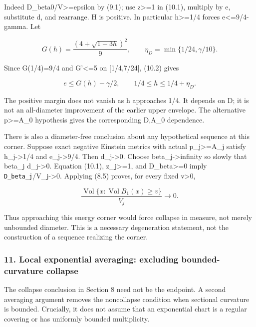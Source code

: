 \documentclass[
  10pt,
]{article}
\begin{document}
Indeed D\_beta0/V\textgreater=epsilon by (9.1); use z\textgreater=1 in
(10.1), multiply by e, substitute d, and rearrange. H is positive. In
particular h\textgreater=1/4 forces e\textless=9/4-gamma. Let

\[
 G(h)=\frac{(4+\sqrt{1-3h})^2}{9},\qquad
 \eta_D=\min\{1/24,\gamma/10\}.
\]

Since G(1/4)=9/4 and \textbar G'\textbar\textless=5 on {[}1/4,7/24{]},
(10.2) gives

\[
 \boxed{e\le G(h)-\gamma/2,
              \qquad 1/4\le h\le1/4+\eta_D.}          \tag{10.3}
\]

The positive margin does not vanish as h approaches 1/4. It depends on
D; it is not an all-diameter improvement of the earlier upper envelope.
The alternative p\textgreater=A\_0 hypothesis gives the corresponding
D,A\_0 dependence.

There is also a diameter-free conclusion about any hypothetical sequence
at this corner. Suppose exact negative Einstein metrics with actual
p\_j\textgreater=A\_j satisfy h\_j-\textgreater1/4 and
e\_j-\textgreater9/4. Then d\_j-\textgreater0. Choose
beta\_j-\textgreater infinity so slowly that beta\_j d\_j-\textgreater0.
Equation (10.1), z\_j\textgreater=1, and D\_beta\textgreater=0 imply
\nolinkurl{D_beta_j}/V\_j-\textgreater0. Applying (8.5) proves, for every fixed
v\textgreater0,

\[
 \frac{\operatorname{Vol}\{x:\operatorname{Vol}B_1(x)\ge v\}}{V_j}
                        \longrightarrow0.            \tag{10.4}
\]

Thus approaching this energy corner would force collapse in measure, not
merely unbounded diameter. This is a necessary degeneration statement,
not the construction of a sequence realizing the corner.

\hypertarget{local-exponential-averaging-excluding-bounded-curvature-collapse}{%
\subsubsection{11. Local exponential averaging: excluding
bounded-curvature
collapse}\label{local-exponential-averaging-excluding-bounded-curvature-collapse}}

The collapse conclusion in Section 8 need not be the endpoint. A second
averaging argument removes the noncollapse condition when sectional
curvature is bounded. Crucially, it does not assume that an exponential
chart is a regular covering or has uniformly bounded multiplicity.
\end{document}
